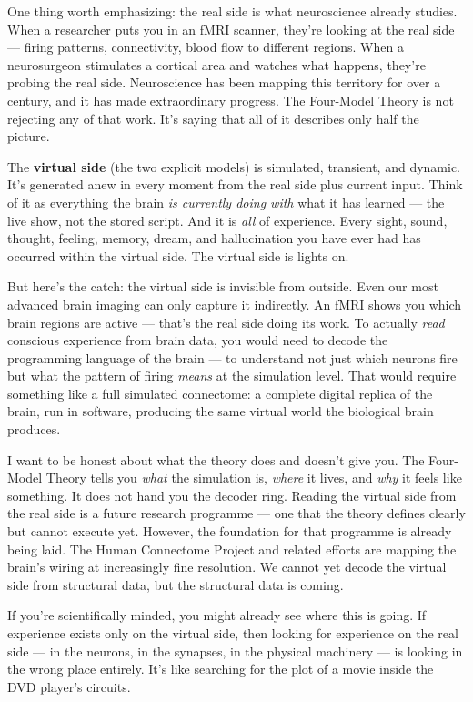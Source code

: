 \documentclass[11pt, twoside, openright]{book}
\begin{document}
One thing worth emphasizing: the real side is what neuroscience already studies. When a researcher puts you in an fMRI scanner, they're looking at the real side --- firing patterns, connectivity, blood flow to different regions. When a neurosurgeon stimulates a cortical area and watches what happens, they're probing the real side. Neuroscience has been mapping this territory for over a century, and it has made extraordinary progress. The Four-Model Theory is not rejecting any of that work. It's saying that all of it describes only half the picture.

The \textbf{virtual side} (the two explicit models) is simulated, transient, and dynamic. It's generated anew in every moment from the real side plus current input. Think of it as everything the brain \textit{is currently doing with} what it has learned --- the live show, not the stored script. And it is \textit{all} of experience. Every sight, sound, thought, feeling, memory, dream, and hallucination you have ever had has occurred within the virtual side. The virtual side is lights on.

But here's the catch: the virtual side is invisible from outside. Even our most advanced brain imaging can only capture it indirectly. An fMRI shows you which brain regions are active --- that's the real side doing its work. To actually \textit{read} conscious experience from brain data, you would need to decode the programming language of the brain --- to understand not just which neurons fire but what the pattern of firing \textit{means} at the simulation level. That would require something like a full simulated connectome: a complete digital replica of the brain, run in software, producing the same virtual world the biological brain produces.

I want to be honest about what the theory does and doesn't give you. The Four-Model Theory tells you \textit{what} the simulation is, \textit{where} it lives, and \textit{why} it feels like something. It does not hand you the decoder ring. Reading the virtual side from the real side is a future research programme --- one that the theory defines clearly but cannot execute yet. However, the foundation for that programme is already being laid. The Human Connectome Project and related efforts are mapping the brain's wiring at increasingly fine resolution. We cannot yet decode the virtual side from structural data, but the structural data is coming.

If you're scientifically minded, you might already see where this is going. If experience exists only on the virtual side, then looking for experience on the real side --- in the neurons, in the synapses, in the physical machinery --- is looking in the wrong place entirely. It's like searching for the plot of a movie inside the DVD player's circuits.
\end{document}
